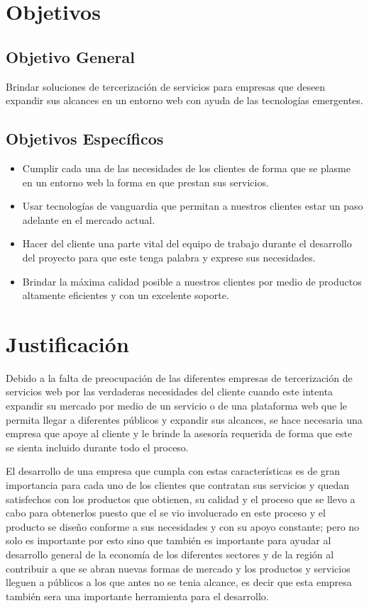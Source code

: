\newpage

\section{Objetivos}

\subsection{Objetivo General}

Brindar soluciones de tercerización de servicios para empresas que deseen expandir sus alcances en un entorno web con ayuda de las tecnologías emergentes.


\subsection{Objetivos Específicos}
\begin{itemize}
	\item Cumplir cada una de las necesidades de los clientes de forma que se plasme en un entorno web la forma en que prestan sus servicios.
	\item Usar tecnologías de vanguardia que permitan a nuestros clientes estar un paso adelante en el mercado actual. 
	\item Hacer del cliente una parte vital del equipo de trabajo durante el desarrollo del proyecto para que este tenga palabra y exprese sus necesidades.
	\item Brindar la máxima calidad posible a nuestros clientes por medio de productos altamente eficientes y con un excelente soporte.
\end{itemize}
\newpage

\section{Justificación}

Debido a la falta de preocupación de las diferentes empresas de tercerización de servicios web por las verdaderas necesidades del cliente cuando este intenta expandir su mercado por medio de un servicio o de una plataforma web que le permita llegar a diferentes públicos y expandir sus alcances, se hace necesaria una empresa que apoye al cliente y le brinde la asesoría requerida de forma que este se sienta incluido durante todo el proceso.
\newline

El desarrollo de una empresa que cumpla con estas características es de gran importancia para cada uno de los clientes que contratan sus servicios y quedan satisfechos con los productos que obtienen, su calidad y el proceso que se llevo a cabo para obtenerlos puesto que el se vio involucrado en este proceso y el producto se diseño conforme a sus necesidades y con su apoyo constante; pero no solo es importante por esto sino que también es importante para ayudar al desarrollo general de la economía de los diferentes sectores y de la región al contribuir a que se abran nuevas formas de mercado y los productos y servicios lleguen a públicos a los que antes no se tenia alcance, es decir que esta empresa también sera una importante herramienta para el desarrollo. 
\newpage

